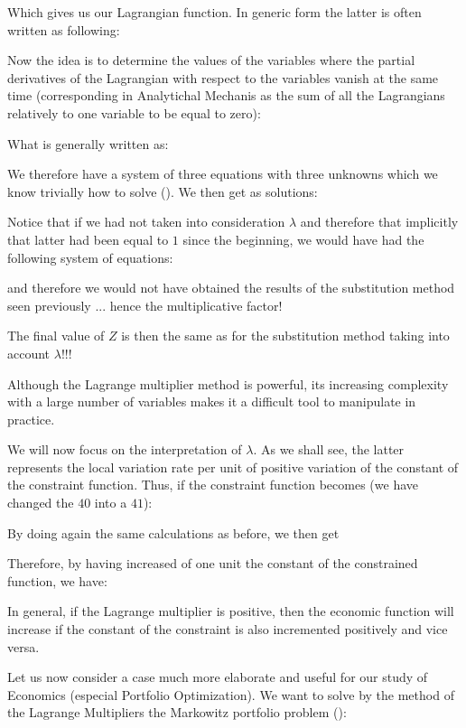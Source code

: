 	Which gives us our Lagrangian function. In generic form the latter is often written as following:
	
 	Now the idea is to determine the values of the variables where the partial derivatives of the Lagrangian with respect to the variables vanish at the same time (corresponding in Analytichal Mechanis as the sum of all the Lagrangians relatively to one variable to be equal to zero):
	
 	What is generally written as:
	
	We therefore have a system of three equations with three unknowns which we know trivially how to solve (). We then get as solutions:
	
 	Notice that if we had not taken into consideration $\lambda$ and therefore that implicitly that latter had been equal to $1$ since the beginning, we would have had the following system of equations:
	
	and therefore we would not have obtained the results of the substitution method seen previously ... hence the multiplicative factor!

	The final value of $Z$ is then the same as for the substitution method taking into account $\lambda$!!!

	Although the Lagrange multiplier method is powerful, its increasing complexity with a large number of variables makes it a difficult tool to manipulate in practice.

	We will now focus on the interpretation of $\lambda$. As we shall see, the latter represents the local variation rate per unit of positive variation of the constant of the constraint function. Thus, if the constraint function becomes (we have changed the $40$ into a $41$):
	
	By doing again the same calculations as before, we then get
	
 	Therefore, by having increased of one unit the constant of the constrained function, we have:
	
 	In general, if the Lagrange multiplier is positive, then the economic function will increase if the constant of the constraint is also incremented positively and vice versa.

	Let us now consider a case much more elaborate and useful for our study of Economics (especial Portfolio Optimization). We want to solve by the method of the Lagrange Multipliers the Markowitz portfolio problem ():
	
